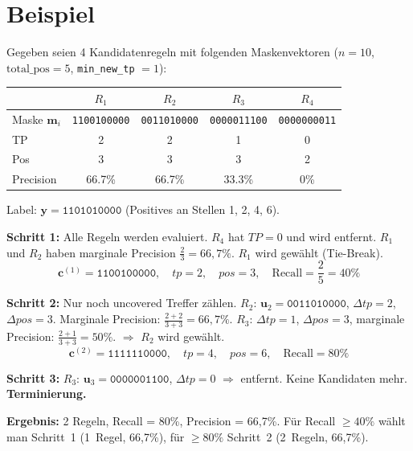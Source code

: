 \documentclass[11pt,a4paper]{article}
\begin{document}
\section{Beispiel}

Gegeben seien 4 Kandidatenregeln mit folgenden Maskenvektoren ($n = 10$, $\text{total\_pos} = 5$, \texttt{min\_new\_tp} $= 1$):

\medskip
\begin{center}
\renewcommand{\arraystretch}{1.2}
\begin{tabular}{lcccc}
\toprule
& $R_1$ & $R_2$ & $R_3$ & $R_4$ \\
\midrule
Maske $\mathbf{m}_i$ & \texttt{1100100000} & \texttt{0011010000} & \texttt{0000011100} & \texttt{0000000011} \\
TP & 2 & 2 & 1 & 0 \\
Pos & 3 & 3 & 3 & 2 \\
Precision & 66.7\% & 66.7\% & 33.3\% & 0\% \\
\bottomrule
\end{tabular}
\end{center}

\medskip
\noindent Label: $\mathbf{y} = \texttt{1101010000}$ (Positives an Stellen 1, 2, 4, 6).

\bigskip
\textbf{Schritt 1:} Alle Regeln werden evaluiert. $R_4$ hat $\mathit{TP} = 0$ und wird entfernt. $R_1$ und $R_2$ haben marginale Precision $\frac{2}{3} = 66{,}7\%$. $R_1$ wird gew\"ahlt (Tie-Break).
\[
  \mathbf{c}^{(1)} = \texttt{1100100000}, \quad \mathit{tp} = 2, \quad \mathit{pos} = 3, \quad \text{Recall} = \frac{2}{5} = 40\%
\]

\textbf{Schritt 2:} Nur noch uncovered Treffer z\"ahlen. $R_2$: $\mathbf{u}_2 = \texttt{0011010000}$, $\Delta\mathit{tp} = 2$, $\Delta\mathit{pos} = 3$. Marginale Precision: $\frac{2+2}{3+3} = 66{,}7\%$. $R_3$: $\Delta\mathit{tp} = 1$, $\Delta\mathit{pos} = 3$, marginale Precision: $\frac{2+1}{3+3} = 50\%$. $\Rightarrow$ $R_2$ wird gew\"ahlt.
\[
  \mathbf{c}^{(2)} = \texttt{1111110000}, \quad \mathit{tp} = 4, \quad \mathit{pos} = 6, \quad \text{Recall} = 80\%
\]

\textbf{Schritt 3:} $R_3$: $\mathbf{u}_3 = \texttt{0000001100}$, $\Delta\mathit{tp} = 0$ $\Rightarrow$ entfernt. Keine Kandidaten mehr. \textbf{Terminierung.}

\bigskip
\noindent\textbf{Ergebnis:} 2 Regeln, Recall = 80\%, Precision = 66{,}7\%. F\"ur Recall $\geq 40\%$ w\"ahlt man Schritt~1 (1~Regel, 66{,}7\%), f\"ur $\geq 80\%$ Schritt~2 (2~Regeln, 66{,}7\%).
\end{document}
